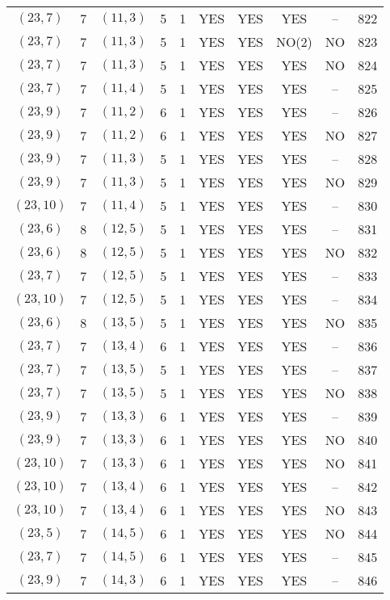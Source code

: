 \begin{longtable}{|c|c|c|c|c|c|c|c|c|c|}
$(23, 7)$ & 7 & $(11, 3)$ & 5 & 1 & YES & YES & YES & -- & 822\\
$(23, 7)$ & 7 & $(11, 3)$ & 5 & 1 & YES & YES & NO(2) & NO & 823\\
$(23, 7)$ & 7 & $(11, 3)$ & 5 & 1 & YES & YES & YES & NO & 824\\
$(23, 7)$ & 7 & $(11, 4)$ & 5 & 1 & YES & YES & YES & -- & 825\\
$(23, 9)$ & 7 & $(11, 2)$ & 6 & 1 & YES & YES & YES & -- & 826\\
$(23, 9)$ & 7 & $(11, 2)$ & 6 & 1 & YES & YES & YES & NO & 827\\
$(23, 9)$ & 7 & $(11, 3)$ & 5 & 1 & YES & YES & YES & -- & 828\\
$(23, 9)$ & 7 & $(11, 3)$ & 5 & 1 & YES & YES & YES & NO & 829\\
$(23, 10)$ & 7 & $(11, 4)$ & 5 & 1 & YES & YES & YES & -- & 830\\
$(23, 6)$ & 8 & $(12, 5)$ & 5 & 1 & YES & YES & YES & -- & 831\\
$(23, 6)$ & 8 & $(12, 5)$ & 5 & 1 & YES & YES & YES & NO & 832\\
$(23, 7)$ & 7 & $(12, 5)$ & 5 & 1 & YES & YES & YES & -- & 833\\
$(23, 10)$ & 7 & $(12, 5)$ & 5 & 1 & YES & YES & YES & -- & 834\\
$(23, 6)$ & 8 & $(13, 5)$ & 5 & 1 & YES & YES & YES & NO & 835\\
$(23, 7)$ & 7 & $(13, 4)$ & 6 & 1 & YES & YES & YES & -- & 836\\
$(23, 7)$ & 7 & $(13, 5)$ & 5 & 1 & YES & YES & YES & -- & 837\\
$(23, 7)$ & 7 & $(13, 5)$ & 5 & 1 & YES & YES & YES & NO & 838\\
$(23, 9)$ & 7 & $(13, 3)$ & 6 & 1 & YES & YES & YES & -- & 839\\
$(23, 9)$ & 7 & $(13, 3)$ & 6 & 1 & YES & YES & YES & NO & 840\\
$(23, 10)$ & 7 & $(13, 3)$ & 6 & 1 & YES & YES & YES & NO & 841\\
$(23, 10)$ & 7 & $(13, 4)$ & 6 & 1 & YES & YES & YES & -- & 842\\
$(23, 10)$ & 7 & $(13, 4)$ & 6 & 1 & YES & YES & YES & NO & 843\\
$(23, 5)$ & 7 & $(14, 5)$ & 6 & 1 & YES & YES & YES & NO & 844\\
$(23, 7)$ & 7 & $(14, 5)$ & 6 & 1 & YES & YES & YES & -- & 845\\
$(23, 9)$ & 7 & $(14, 3)$ & 6 & 1 & YES & YES & YES & -- & 846\\

\end{longtable}
